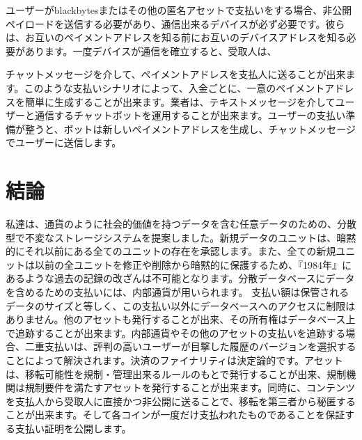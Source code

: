 \documentclass[a4paper, dvipdfmx]{jsarticle}
\begin{document}
ユーザーがblackbytesまたはその他の匿名アセットで支払いをする場合、非公開ペイロードを送信する必要があり、通信出来るデバイスが必ず必要です。彼らは、お互いのペイメントアドレスを知る前にお互いのデバイスアドレスを知る必要があります。一度デバイスが通信を確立すると、受取人は、

チャットメッセージを介して、ペイメントアドレスを支払人に送ることが出来ます。このような支払いシナリオによって、入金ごとに、一意のペイメントアドレスを簡単に生成することが出来ます。業者は、テキストメッセージを介してユーザーと通信するチャットボットを運用することが出来ます。ユーザーの支払い準備が整うと、ボットは新しいペイメントアドレスを生成し、チャットメッセージでユーザーに送信します。

\section{結論}
私達は、通貨のように社会的価値を持つデータを含む任意データのための、分散型で不変なストレージシステムを提案しました。新規データのユニットは、暗黙的にそれ以前にある全てのユニットの存在を承認します。また、全ての新規ユニットは以前の全ユニットを修正や削除から暗黙的に保護するため、『1984年』にあるような過去の記録の改ざんは不可能となります。分散データベースにデータを含めるための支払いには、内部通貨が用いられます。 支払い額は保管されるデータのサイズと等しく、この支払い以外にデータベースへのアクセスに制限はありません。他のアセットも発行することが出来、その所有権はデータベース上で追跡することが出来ます。内部通貨やその他のアセットの支払いを追跡する場合、二重支払いは、評判の高いユーザーが目撃した履歴のバージョンを選択することによって解決されます。決済のファイナリティは決定論的です。アセットは、移転可能性を規制・管理出来るルールのもとで発行することが出来、規制機関は規制要件を満たすアセットを発行することが出来ます。同時に、コンテンツを支払人から受取人に直接かつ非公開に送ることで、移転を第三者から秘匿することが出来ます。そして各コインが一度だけ支払われたものであることを保証する支払い証明を公開します。

\vspace{20pt}
\end{document}

